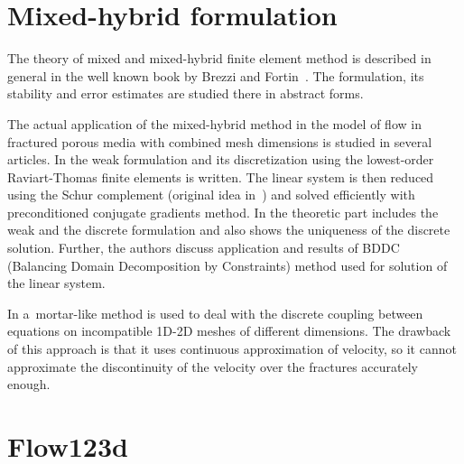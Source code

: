 
\section{Mixed-hybrid formulation}
The theory of mixed and mixed-hybrid finite element method is described in general in the well known book by 
Brezzi and Fortin~\cite{brezzi_mixed_1991}. 
The formulation, its stability and error estimates are studied there in abstract forms.

The actual application of the mixed-hybrid method in the model of flow in fractured porous 
media with combined mesh dimensions is studied in several articles.
In \cite{brezina_mixed-hybrid_2010} the weak formulation and its discretization using the lowest-order Raviart-Thomas finite 
elements is written. The linear system is then reduced using the Schur complement (original idea in~\cite{maryska_mixed-hybrid_1995})
and solved efficiently with preconditioned conjugate gradients method.
In \cite{sistek_bddc_2015} the theoretic part includes the weak and the discrete formulation and also shows
the uniqueness of the discrete solution. Further, the authors discuss application and results of BDDC 
(Balancing Domain Decomposition by Constraints) method used for solution of the linear system.

In \cite{brezina_2012} a~mortar-like method is used to deal with the discrete coupling between equations on incompatible 1D-2D meshes 
of different dimensions. The drawback of this approach is that it uses continuous approximation of velocity, so
it cannot approximate the discontinuity of the velocity over the fractures accurately enough.



\section{Flow123d} \label{sec:soa_flow123d}


